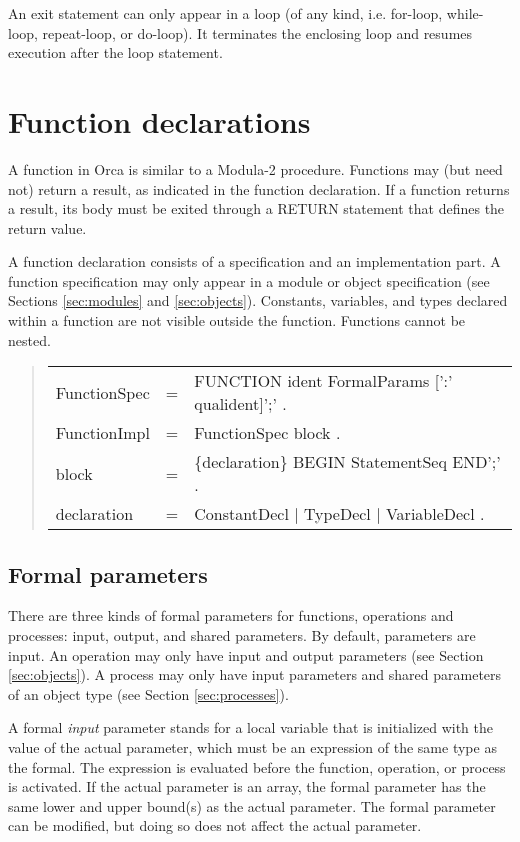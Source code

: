 \documentclass[10pt]{article}
\newenvironment{grammar}
{\begin{quote} \begin{tabular}{p{3.8cm} l l}}
{\end{tabular}\end{quote}}
\begin{document}
An exit statement can only appear in a loop (of any kind, i.e.
for-loop, while-loop, repeat-loop, or do-loop). It terminates the enclosing loop
and resumes execution after the loop statement.
\section{Function declarations}\label{sec:functions}

A function in Orca is similar to a Modula-2 procedure.
Functions may (but need not) return a result, as indicated in the
function declaration. If a function returns a result, its body must
be exited through a RETURN statement that defines the return value.

A function declaration consists of a specification and an implementation part.
A function specification may only appear in a module or object
specification (see Sections \ref{sec:modules} and \ref{sec:objects}).
Constants, variables, and types declared within a function are not
visible outside the function.
Functions cannot be nested.
\begin{grammar}
FunctionSpec & = & FUNCTION ident FormalParams [':' qualident]';' . \\
FunctionImpl & = & FunctionSpec  block . \\
block & = & \{declaration\} BEGIN StatementSeq END';' . \\
declaration & = & ConstantDecl $|$ TypeDecl $|$ VariableDecl .
\end{grammar}
\subsection{Formal parameters}\label{sec:formals}

There are three kinds of formal parameters for functions, operations and
processes: input, output, and shared parameters.
By default, parameters are input.
An operation may only have input and output parameters (see Section \ref{sec:objects}).
A process may only have input parameters and shared parameters of an
object type (see Section \ref{sec:processes}).

A formal {\em input} parameter stands for a local variable that is initialized
with the value of the actual parameter, which must be an expression
of the same type as the formal.
The expression is evaluated before the function, operation, or process
is activated.
If the actual parameter is an array, the formal parameter has the same
lower and upper bound(s) as the actual parameter.
The formal parameter can be modified, but doing so does not affect
the actual parameter.
\end{document}
